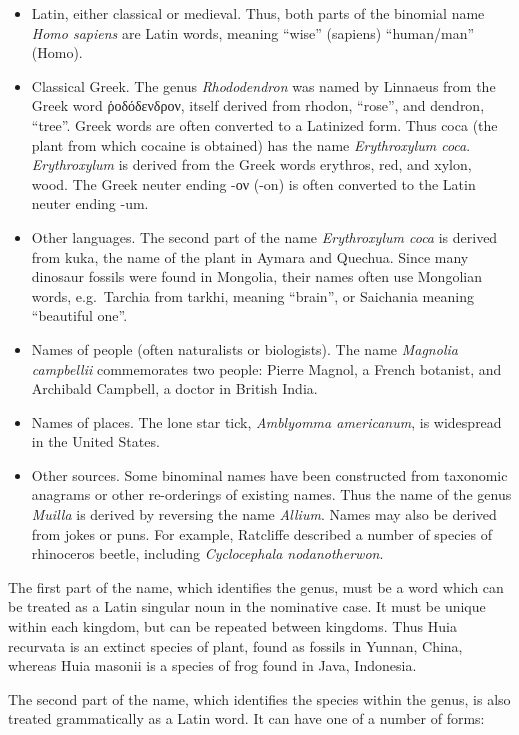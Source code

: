 \begin{itemize}
\tightlist
\item
  Latin, either classical or medieval. Thus, both parts of the binomial name \emph{Homo sapiens} are Latin words, meaning ``wise'' (sapiens) ``human/man'' (Homo).
\item
  Classical Greek. The genus \emph{Rhododendron} was named by Linnaeus from the Greek word ῥοδόδενδρον, itself derived from rhodon, ``rose'', and dendron, ``tree''. Greek words are often converted to a Latinized form. Thus coca (the plant from which cocaine is obtained) has the name \emph{Erythroxylum coca}. \emph{Erythroxylum} is derived from the Greek words erythros, red, and xylon, wood. The Greek neuter ending -ον (-on) is often converted to the Latin neuter ending -um.
\item
  Other languages. The second part of the name \emph{Erythroxylum coca} is derived from kuka, the name of the plant in Aymara and Quechua. Since many dinosaur fossils were found in Mongolia, their names often use Mongolian words, e.g.~Tarchia from tarkhi, meaning ``brain'', or Saichania meaning ``beautiful one''.
\item
  Names of people (often naturalists or biologists). The name \emph{Magnolia campbellii} commemorates two people: Pierre Magnol, a French botanist, and Archibald Campbell, a doctor in British India.
\item
  Names of places. The lone star tick, \emph{Amblyomma americanum}, is widespread in the United States.
\item
  Other sources. Some binominal names have been constructed from taxonomic anagrams or other re-orderings of existing names. Thus the name of the genus \emph{Muilla} is derived by reversing the name \emph{Allium}. Names may also be derived from jokes or puns. For example, Ratcliffe described a number of species of rhinoceros beetle, including \emph{Cyclocephala nodanotherwon}.
\end{itemize}

The first part of the name, which identifies the genus, must be a word which can be treated as a Latin singular noun in the nominative case. It must be unique within each kingdom, but can be repeated between kingdoms. Thus Huia recurvata is an extinct species of plant, found as fossils in Yunnan, China, whereas Huia masonii is a species of frog found in Java, Indonesia.

The second part of the name, which identifies the species within the genus, is also treated grammatically as a Latin word. It can have one of a number of forms:

